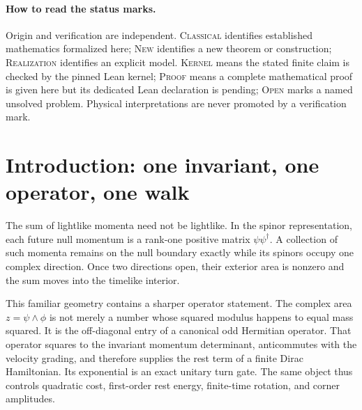 \documentclass[11pt]{article}
\newcommand{\Kernel}{\textcolor{kernelcolor}{\textsc{Kernel}}}
\newcommand{\Human}{\textcolor{humanproofcolor}{\textsc{Proof}}}
\newcommand{\Open}{\textcolor{opencolor}{\textsc{Open}}}
\newcommand{\Classical}{\textcolor{classicalcolor}{\textsc{Classical}}}
\newcommand{\NewResult}{\textsc{New}}
\newcommand{\Realization}{\textsc{Realization}}
\begin{document}
\begin{abstract}
body-center step retains $\pm1$ eigenmodes for every mass angle, so this
regulator cannot open a global Floquet gap; no degree-one nearest-neighbor
factor supports a stationary amplitude compatible with origin normalization,
exact unitarity, and the full Dirac tangent; every momentum-independent onsite
coin leaves all three even-parity aliases intact; the positive homogeneous
Pluecker action selects only the collapsed zero scale; and exact two-step
blocking closes the mass subgroup but not the ordered split family.  A
pre-registered high-momentum benchmark passes all alias, body-center,
Wilson-gap, and negative-control thresholds.  Every finite statement above is
checked in Lean~4; the novelty is the derived rest operator and its verified
dynamical chain, not a new constant-coefficient $1+1$ walk.  A strict
alias-free discrete-time $3+1$ regulator, position-space PDE convergence, a
local interacting Fock dynamics, and any absolute mass scale remain open.
\end{abstract}

\paragraph{How to read the status marks.}
Origin and verification are independent.  \Classical{} identifies established
mathematics formalized here; \NewResult{} identifies a new theorem or
construction; \Realization{} identifies an explicit model.  \Kernel{} means
the stated finite claim is checked by the pinned Lean kernel; \Human{} means a
complete mathematical proof is given here but its dedicated Lean declaration
is pending; \Open{} marks a named unsolved problem.  Physical interpretations
are never promoted by a verification mark.

\section{Introduction: one invariant, one operator, one walk}

The sum of lightlike momenta need not be lightlike.  In the spinor
representation, each future null momentum is a rank-one positive matrix
$\psi\psi^\dagger$.  A collection of such momenta remains on the null boundary
exactly while its spinors occupy one complex direction.  Once two directions
open, their exterior area is nonzero and the sum moves into the timelike
interior.

This familiar geometry contains a sharper operator statement.  The complex
area $z=\psi\wedge\phi$ is not merely a number whose squared modulus happens
to equal mass squared.  It is the off-diagonal entry of a canonical odd
Hermitian operator.  That operator squares to the invariant momentum
determinant, anticommutes with the velocity grading, and therefore supplies the
rest term of a finite Dirac Hamiltonian.  Its exponential is an exact unitary
turn gate.  The same object thus controls quadratic cost, first-order rest
energy, finite-time rotation, and corner amplitudes.
\end{document}

